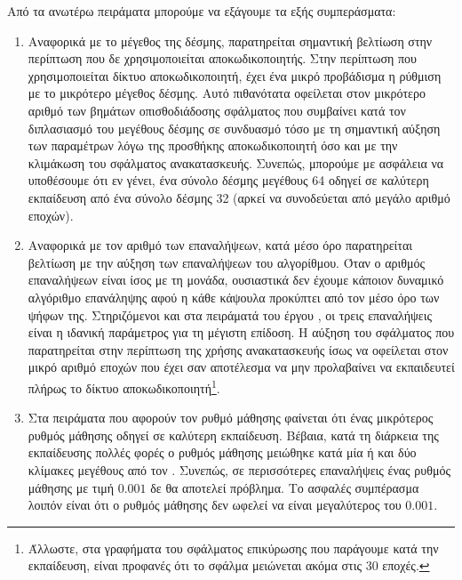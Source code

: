 Από τα ανωτέρω πειράματα μπορούμε να εξάγουμε τα εξής συμπεράσματα:
\begin{enumerate}
    \item Αναφορικά με το μέγεθος της δέσμης, παρατηρείται σημαντική βελτίωση στην περίπτωση που δε χρησιμοποιείται αποκωδικοποιητής. Στην περίπτωση που χρησιμοποιείται δίκτυο αποκωδικοποιητή, έχει ένα μικρό προβάδισμα η ρύθμιση με το μικρότερο μέγεθος δέσμης. Αυτό πιθανότατα οφείλεται στον μικρότερο αριθμό των βημάτων οπισθοδιάδοσης σφάλματος που συμβαίνει κατά τον διπλασιασμό του μεγέθους δέσμης σε συνδυασμό τόσο με τη σημαντική αύξηση των παραμέτρων λόγω της προσθήκης αποκωδικοποιητή όσο και με την κλιμάκωση του σφάλματος ανακατασκευής. Συνεπώς, μπορούμε με ασφάλεια να υποθέσουμε ότι εν γένει, ένα σύνολο δέσμης μεγέθους 64 οδηγεί σε καλύτερη εκπαίδευση από ένα σύνολο δέσμης 32 (αρκεί να συνοδεύεται από μεγάλο αριθμό εποχών).
    \item Αναφορικά με τον αριθμό των επαναλήψεων, κατά μέσο όρο παρατηρείται βελτίωση με την αύξηση των επαναλήψεων του αλγορίθμου. Όταν ο αριθμός επαναλήψεων είναι ίσος με τη μονάδα, ουσιαστικά δεν έχουμε κάποιον δυναμικό αλγόριθμο επανάληψης αφού η κάθε κάψουλα  προκύπτει από τον μέσο όρο των ψήφων της. Στηριζόμενοι και στα πειράματά του έργου \cite{sabour2017dynamic}, οι τρεις επαναλήψεις είναι η ιδανική παράμετρος για τη μέγιστη επίδοση. Η αύξηση του σφάλματος που παρατηρείται στην περίπτωση της χρήσης ανακατασκευής ίσως να οφείλεται στον μικρό αριθμό εποχών που έχει σαν αποτέλεσμα να μην προλαβαίνει να εκπαιδευτεί πλήρως το δίκτυο αποκωδικοποιητή\footnote{Άλλωστε, στα γραφήματα του σφάλματος επικύρωσης που παράγουμε κατά την εκπαίδευση, είναι προφανές ότι το σφάλμα μειώνεται ακόμα στις 30 εποχές.}.
    \item Στα πειράματα που αφορούν τον ρυθμό μάθησης φαίνεται ότι ένας μικρότερος ρυθμός μάθησης οδηγεί σε καλύτερη εκπαίδευση. Βέβαια, κατά τη διάρκεια της εκπαίδευσης πολλές φορές ο ρυθμός μάθησης μειώθηκε κατά μία ή και δύο κλίμακες μεγέθους από τον . Συνεπώς, σε περισσότερες επαναλήψεις ένας ρυθμός μάθησης με τιμή $0.001$ δε θα αποτελεί πρόβλημα. Το ασφαλές συμπέρασμα λοιπόν είναι ότι ο ρυθμός μάθησης δεν ωφελεί να είναι μεγαλύτερος του $0.001$.
\end{enumerate}

